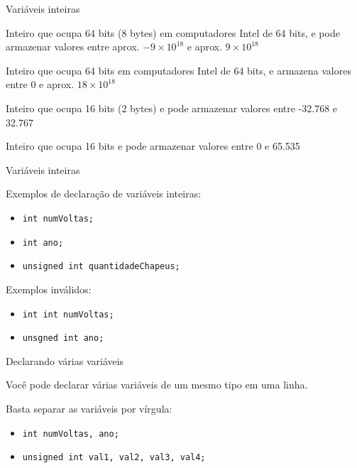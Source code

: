 \documentclass[handout]{beamer}
\begin{document}
\begin{frame}{Variáveis inteiras}

    \begin{description}[<+->]
        \item[long int] Inteiro que ocupa 64 bits (8 bytes) em computadores Intel de 64 bits, e pode armazenar valores entre aprox. $-9\times10^{18}$ e aprox. $9\times10^{18}$
        \item[unsigned long int] Inteiro que ocupa 64 bits em computadores Intel de 64 bits, e armazena valores entre $0$ e aprox. $18 \times 10^{18}$
        \item[short int] Inteiro que ocupa 16 bits (2 bytes) e pode armazenar valores entre -32.768 e 32.767
        \item[unsigned short int] Inteiro que ocupa 16 bits e pode armazenar valores entre 0 e 65.535
    \end{description}
\end{frame}

\begin{frame}{Variáveis inteiras}

    Exemplos de declaração de variáveis inteiras:
    \begin{itemize}
        \item \texttt{int numVoltas;}
        \item \texttt{int ano;}
        \item \texttt{unsigned int quantidadeChapeus;}
    \end{itemize}

    \pause
    Exemplos inválidos:
    \begin{itemize}
        \item \texttt{int int numVoltas;}
        \item \texttt{unsgned int ano;}
    \end{itemize}
\end{frame}

\begin{frame}{Declarando várias variáveis}
    
    Você pode declarar várias variáveis de um mesmo tipo em uma linha.

    Basta separar as variáveis por vírgula:
    \begin{itemize}
        \item \texttt{int numVoltas, ano;}
        \item \texttt{unsigned int val1, val2, val3, val4;}
    \end{itemize}
\end{frame}
\end{document}
